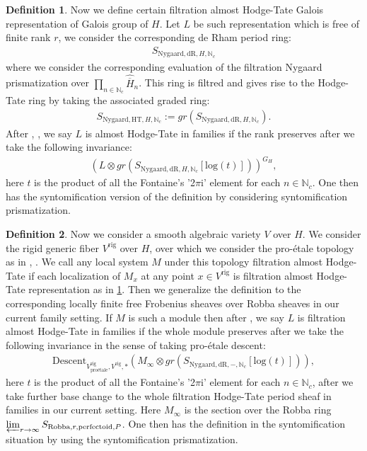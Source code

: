 \documentclass[12pt]{article}
\theoremstyle{definition}
\newtheorem{definition}{Definition}
\begin{document}
\begin{definition} \label{definition52}
Now we define certain filtration almost Hodge-Tate Galois representation of Galois group of $H$. Let $L$ be such representation which is free of finite rank $r$, we consider the corresponding de Rham period ring:
\begin{align}
S_{\mathrm{Nygaard},\mathrm{dR},H,\mathbb{N}_c}
\end{align}
where we consider the corresponding evaluation of the filtration Nygaard prismatization over $\prod_{n\in \mathbb{N}_c}\widehat{\overline{H}}_n$. This ring is filtred and gives rise to the Hodge-Tate ring by taking the associated graded ring:
\begin{align}
S_{\mathrm{Nygaard},\mathrm{HT},H,\mathbb{N}_c}:=gr(S_{\mathrm{Nygaard},\mathrm{dR},H,\mathbb{N}_c}).
\end{align}
After \cite{5F2}, \cite{5BLA}, \cite{5BLB} we say $L$ is almost Hodge-Tate in families if the rank preserves after we take the following invariance:
\begin{align}
(L\otimes gr(S_{\mathrm{Nygaard},\mathrm{dR},H,\mathbb{N}_c}[\mathrm{log}(t)]))^{G_H},
\end{align}
here $t$ is the product of all the Fontaine's '2$\pi$i' element for each $n\in \mathbb{N}_c$. One then has the syntomification version of the definition by considering syntomification prismatization.
\end{definition}

\begin{definition}
Now we consider a smooth algebraic variety $V$ over $H$. We consider the rigid generic fiber $V^\mathrm{rig}$ over $H$, over which we consider the pro-\'etale topology as in \cite{5L}, \cite{5S1}. We call any local system $M$ under this topology filtration almost Hodge-Tate if each localization of $M_x$ at any point $x\in V^\mathrm{rig}$ is filtration almost Hodge-Tate representation as in \cref{definition52}. Then we generalize the definition to the corresponding locally finite free Frobenius sheaves over Robba sheaves in our current family setting. If $M$ is such a module then after \cite{5KLA}, \cite{5KLB} we say $L$ is filtration almost Hodge-Tate in families if the whole module preserves after we take the following invariance in the sense of taking pro-\'etale descent:
\begin{align}
\mathrm{Descent}_{V^\mathrm{rig}_\text{pro\'etale},V^\mathrm{rig},*}(M_\infty\otimes gr(S_{\mathrm{Nygaard},\mathrm{dR},-,\mathbb{N}_c}[\mathrm{log}(t)])),
\end{align}
here $t$ is the product of all the Fontaine's '2$\pi$i' element for each $n\in \mathbb{N}_c$, after we take further base change to the whole filtration Hodge-Tate period sheaf in families in our current setting. Here $M_\infty$ is the section over the Robba ring $\varprojlim_{r\rightarrow \infty}S_{\mathrm{Robba},r,\mathrm{perfectoid},P}$. One then has the definition in the syntomification situation by using the syntomification prismatization.
\end{definition}
\end{document}
